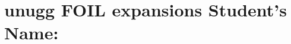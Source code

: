 \documentclass[12pt, a4paper, addpoints]{exam}
\newcommand{\gap}{\vspace{15mm}}
\newcommand{\Gap}{\vspace{38mm}}
\newcommand{\Gap}{\vspace{36mm}}
\newcommand{\unugg}{%
    \pgfmathtruncatemacro{\a}{random(2,9)} 
    \pgfmathtruncatemacro{\b}{random(2,9)} 
      \pgfmathtruncatemacro{\c}{random(2,9)} 
    \edef\result{(x - \c)(\b x +\a)}%
    \result
}
\begin{document}
\section*{unugg  FOIL expansions  \quad Student's Name: \underline{\hspace{5cm}}} 


\begin{questions}
\LARGE

\question
\gap
  
\setlength{\columnsep}{20pt}
\begin{multicols}{3}

\begin{parts}
    \part \( \unugg \)
      \Gap
       \part \( \unugg \)
    \Gap
       \part \( \unugg \)
    \Gap
       \part \( \unugg \)
    \Gap
       \part \( \unugg \)
    \Gap
       \part \( \unugg \)
    \Gap
       \part \( \unugg \)
    \Gap
       \part \( \unugg \)
    \Gap
       \part \( \unugg \)
    \Gap
           \part \( \unugg \)
    \Gap

\end{parts}
\end{multicols}
\end{questions}
\end{document}
